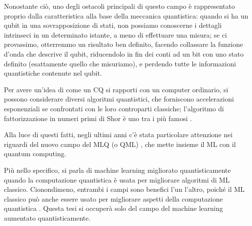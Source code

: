
Nonostante ciò, uno degli ostacoli principali di questo campo è rappresentato proprio dalla 
caratteristica alla base della meccanica quantistica: quando si ha un qubit 
in una sovrapposizione di stati, non possiamo conoscerne i dettagli intrinseci 
in un determinato istante, a meno di effettuare una misura; se ci provassimo, 
otterremmo un risultato ben definito, facendo collassare la funzione d'onda 
che descrive il qubit, riducendolo in fin dei conti ad un bit con uno stato definito (esattamente 
quello che misuriamo), e perdendo tutte le informazioni quantistiche 
contenute nel qubit. 


Per avere un'idea di come un \ac{CQ} si rapporti con un computer ordinario, 
si possono considerare diversi algoritmi quantistici, che forniscono 
accelerazioni esponenziali se confrontati con le loro controparti classiche; 
l'algoritmo di fattorizzazione in numeri primi di Shor è uno tra i più famosi \cite{shor}. 


Alla luce di questi fatti, negli ultimi anni c'è stata particolare attenzione nei 
riguardi del nuovo campo del \ac{MLQ} (o \ac{QML}) \cite{Biamonte2017} , che mette insieme il 
\ac{ML} con il quantum computing. 

Più nello specifico, si parla di machine learning migliorato quantisticamente quando 
la computazione quantistica è usata per migliorare algoritmi di \ac{ML} classico. 
Cionondimeno, entrambi i campi sono benefici l'un l'altro, 
poiché il \ac{ML} classico può anche essere usato per migliorare aspetti 
della computazione quantistica \cite{PhysRevLett.116.230504}. 
Questa tesi si occuperà solo del campo del machine 
learning aumentato quantisticamente. 

